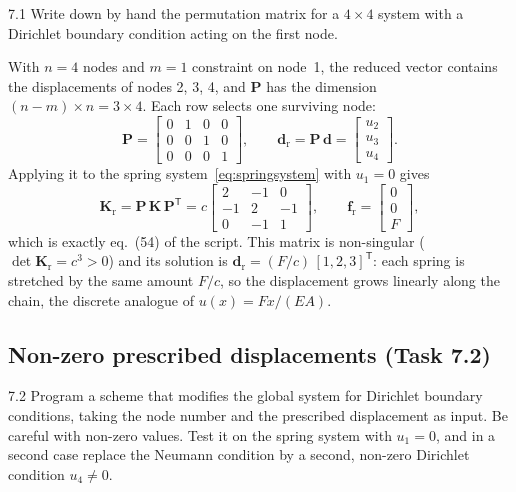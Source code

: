\documentclass[11pt,a4paper]{article}
\numberwithin{equation}{section}
\theoremstyle{remark}
\newcommand{\bK}{\bm{K}}
\newcommand{\bP}{\bm{P}}
\newcommand{\bd}{\bm{d}}
\newcommand{\bff}{\bm{f}}
\begin{document}
\begin{task}{7.1}
  Write down by hand the permutation matrix for a $4\times4$ system with a Dirichlet
  boundary condition acting on the first node.
\end{task}

With $n = 4$ nodes and $m = 1$ constraint on node~1, the reduced vector contains the
displacements of nodes 2, 3, 4, and $\bP$ has the dimension
$(n-m)\times n = 3\times 4$. Each row selects one surviving node:
\begin{equation}\label{eq:P}
  \boxed{\;
  \bP = \begin{bmatrix}
    0 & 1 & 0 & 0 \\
    0 & 0 & 1 & 0 \\
    0 & 0 & 0 & 1
  \end{bmatrix},
  \qquad
  \bd_{\mathrm{r}} = \bP\,\bd = \begin{bmatrix} u_2 \\ u_3 \\ u_4 \end{bmatrix}. \;}
\end{equation}
Applying it to the spring system~\eqref{eq:springsystem} with $u_1 = 0$ gives
\begin{equation}\label{eq:springreduced}
  \bK_{\mathrm{r}} = \bP\,\bK\,\bP^{\mathsf{T}}
  = c\begin{bmatrix}
    2 & -1 & 0 \\
    -1 & 2 & -1 \\
    0 & -1 & 1
  \end{bmatrix},
  \qquad
  \bff_{\mathrm{r}} = \begin{bmatrix} 0 \\ 0 \\ F \end{bmatrix},
\end{equation}
which is exactly eq.~(54) of the script. This matrix is non-singular
($\det\bK_{\mathrm{r}} = c^3 > 0$) and its solution is
$\bd_{\mathrm{r}} = (F/c)\,[1,2,3]^{\mathsf{T}}$: each spring is stretched by the same
amount $F/c$, so the displacement grows linearly along the chain, the discrete analogue of
$u(x) = Fx/(EA)$.

\subsection{Non-zero prescribed displacements (Task 7.2)}\label{sec:nonzero}

\begin{task}{7.2}
  Program a scheme that modifies the global system for Dirichlet boundary conditions,
  taking the node number and the prescribed displacement as input. Be careful with
  non-zero values. Test it on the spring system with $u_1 = 0$, and in a second case
  replace the Neumann condition by a second, non-zero Dirichlet condition $u_4 \ne 0$.
\end{task}
\end{document}
